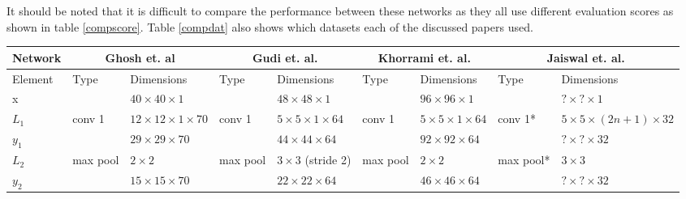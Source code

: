     It should be noted that it is difficult to compare the performance between these
    networks as they all use different evaluation scores as shown in table \ref{compscore}. Table \ref{compdat} also shows
    which datasets each of the discussed papers used.
    \begin{landscape}
    \begin{table}[h!]
    {\footnotesize
    \begin{tabular}{|lllllllll|}
    \hline
    Network                      & \multicolumn{2}{c}{Ghosh et. al\cite{Ghosh2015}}                         & \multicolumn{2}{c}{Gudi et. al.\cite{Gudi2015}}                            & \multicolumn{2}{c}{Khorrami et. al.\cite{Khorrami2015}}                          & \multicolumn{2}{c|}{Jaiswal et. al.\cite{Jaiswal2016}}   \\ \hline
    \multicolumn{1}{|l|}{Element} & Type     & \multicolumn{1}{l|}{Dimensions}                    & Type     & \multicolumn{1}{l|}{Dimensions}                      & Type          & \multicolumn{1}{l|}{Dimensions}                  & Type      & Dimensions                     \\ \hline
    \multicolumn{1}{|l|}{x}       &          & \multicolumn{1}{l|}{$40\times40\times1$}           &          & \multicolumn{1}{l|}{$48\times 48\times1$}            &               & \multicolumn{1}{l|}{$96\times96\times1$}         &           & $?\times?\times1$              \\ \hline
    \multicolumn{1}{|l|}{$L_1$}   & conv 1   & \multicolumn{1}{l|}{$12\times 12\times1\times 70$} & conv 1   & \multicolumn{1}{l|}{$5\times 5\times1\times64$}      & conv 1        & \multicolumn{1}{l|}{$5\times5\times1\times64$}   & conv 1*   & $5\times5\times(2n+1)\times32$ \\
    \multicolumn{1}{|l|}{$y_1$}   &          & \multicolumn{1}{l|}{$29\times29\times70$}          &          & \multicolumn{1}{l|}{$44\times44\times64$}            &               & \multicolumn{1}{l|}{$92\times92\times64$}        &           & $?\times?\times32$             \\ \hline
    \multicolumn{1}{|l|}{$L_2$}   & max pool & \multicolumn{1}{l|}{$2\times 2$}                   & max pool & \multicolumn{1}{l|}{$3\times3$ (stride 2)}           & max pool      & \multicolumn{1}{l|}{$2\times2$}                  & max pool*  & $3\times3$                    \\
    \multicolumn{1}{|l|}{$y_2$}   &          & \multicolumn{1}{l|}{$15\times15\times 70$}         &          & \multicolumn{1}{l|}{$22\times 22\times64$}           &               & \multicolumn{1}{l|}{$46\times46\times64$}        &           & $?\times?\times32$             \\ \hline

\end{tabular}}
\end{table}
\end{landscape}
